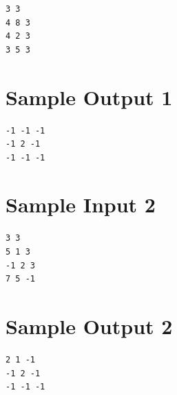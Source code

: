 \documentclass[11pt]{article}
\begin{document}
\begin{verbatim}
3 3
4 8 3
4 2 3
3 5 3
\end{verbatim}

\section*{Sample Output 1}

\begin{verbatim}
-1 -1 -1
-1 2 -1
-1 -1 -1
\end{verbatim}

\section*{Sample Input 2}

\begin{verbatim}
3 3
5 1 3
-1 2 3
7 5 -1
\end{verbatim}

\section*{Sample Output 2}

\begin{verbatim}
2 1 -1
-1 2 -1
-1 -1 -1
\end{verbatim}
\end{document}
